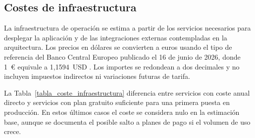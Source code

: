 \subsection{Costes de infraestructura}

La infraestructura de operación se estima a partir de los servicios necesarios para desplegar la aplicación y de las integraciones externas contempladas en la arquitectura. Los precios en dólares se convierten a euros usando el tipo de referencia del Banco Central Europeo publicado el 16 de junio de 2026, donde 1~\euro{} equivale a 1,1594~USD \citep{ecb2026usdeur}. Los importes se redondean a dos decimales y no incluyen impuestos indirectos ni variaciones futuras de tarifa.

La Tabla~\ref{tabla_coste_infraestructura} diferencia entre servicios con coste anual directo y servicios con plan gratuito suficiente para una primera puesta en producción. En estos últimos casos el coste se considera nulo en la estimación base, aunque se documenta el posible salto a planes de pago si el volumen de uso crece.

